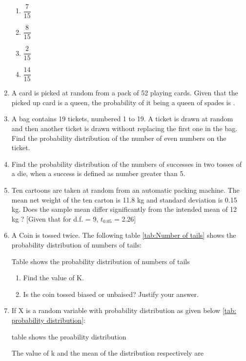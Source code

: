 \begin{enumerate}
\begin{enumerate}
\item $\dfrac{7}{15}$
\item $\dfrac{8}{15}$
\item $\dfrac{2}{15}$
\item $\dfrac{14}{15}$
\end{enumerate}
\item A card is picked at random from a pack of 52 playing cards. Given that the picked up card is a queen, the probability of it being a queen of spades is \underline{\hspace{1cm}}.
\item A bag contains 19 tickets, numbered 1 to 19. A ticket is drawn at random and then another ticket is drawn without replacing the first one in the bag. Find the probability distribution of the number of even numbers on the ticket.
\item Find the probability distribution of the numbers of successes in two tosses of a die, when a success is defined as number greater than 5.
\item Ten cartoons are taken at random from an automatic packing machine. The mean net weight of the ten carton is 11.8 kg and standard deviation is 0.15 kg. Does the sample mean differ significantly from the intended mean of 12 kg ?
[Given that for d.f. = 9, $t_{0.05}$ = 2.26]\\
\item A Coin is tossed twice. The following table \ref{tab:Number of tails} shows the probability distribution of numbers of tails:
\begin{table}[!ht]
	
\caption{Table shows the probability distribution of numbers of tails \label{tab:Number of tails}}
\end{table}
\begin{enumerate}
\item Find the value of K.
\item Is the coin tossed biased or unbaised?
Justify your answer.
\end{enumerate}
\item If X is a random variable with probability distribution as given below \ref{tab: probability distribution}:
\begin{table}[!ht]

\caption{table shows the proability distribution \label{tab: probability distribution}}
\end{table}
\newline The value of k and the mean of the distribution respectively are 

\end{enumerate}
